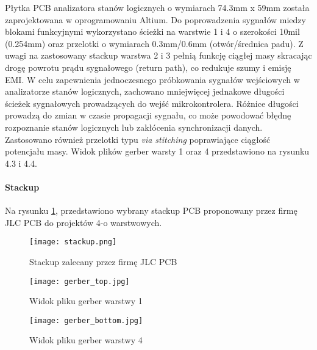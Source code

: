     Płytka PCB analizatora stanów logicznych o wymiarach 74.3mm x 59mm została zaprojektowana w oprogramowaniu Altium.
    Do poprowadzenia sygnałów miedzy blokami funkcyjnymi wykorzystano ścieżki na warstwie 1 i 4 o szerokości 10mil (0.254mm)
    oraz przelotki o wymiarach 0.3mm/0.6mm (otwór/średnica padu). Z uwagi na zastosowany stackup warstwa 2 i 3 pełnią funkcję
    ciągłej masy skracając drogę powrotu prądu sygnałowego (return path), co redukuje szumy i emisję EMI.
    W celu zapewnienia jednoczesnego próbkowania sygnałów wejściowych w analizatorze stanów logicznych, zachowano mniejwięcej 
    jednakowe długości ścieżek sygnałowych prowadzących do wejść mikrokontrolera. Różnice długości prowadzą do zmian w czasie propagacji
    sygnału, co może powodować błędnę rozpoznanie stanów logicznych lub zakłócenia synchronizacji danych. Zastosowano również
    przelotki typu \textit{via stitching} poprawiające ciągłość potencjału masy. Widok plików gerber warsty 1 oraz 4 przedstawiono
    na rysunku 4.3 i 4.4.
    

\paragraph{Stackup}
    Na rysunku \ref{fig:stackup}, przedstawiono wybrany stackup PCB proponowany przez firmę JLC PCB do projektów 4-o warstwowych.
    \begin{figure}[!ht]
        \centering
        \texttt{[image: stackup.png]}
        \caption{Stackup zalecany przez firmę JLC PCB}
        \label{fig:stackup}
    \end{figure}

     \begin{figure}[!ht]
        \centering
        \texttt{[image: gerber\_top.jpg]}
        \caption{Widok pliku gerber warstwy 1 }
        \label{fig:gerber_top}
    \end{figure}

    \begin{figure}[!ht]
        \centering
        \texttt{[image: gerber\_bottom.jpg]}
        \caption{Widok pliku gerber warstwy 4 }
        \label{fig:gerber_bottom}
    \end{figure}
 

